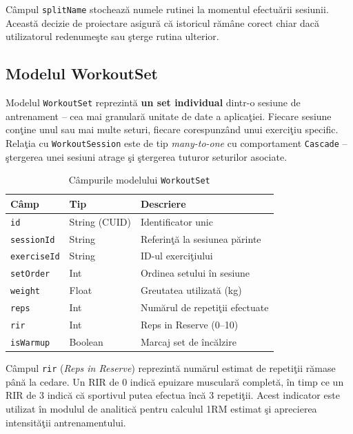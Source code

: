 C\^ ampul \texttt{splitName} stocheaz\u a numele rutinei la momentul
efectu\u arii sesiunii. Aceast\u a decizie de proiectare asigur\u a
c\u a istoricul r\u am\^ ane corect chiar dac\u a utilizatorul
redenume\c ste sau \c sterge rutina ulterior.

\subsection{Modelul WorkoutSet}

Modelul \texttt{WorkoutSet} reprezint\u a \textbf{un set individual}
dintr-o sesiune de antrenament -- cea mai granular\u a unitate de
date a aplica\c tiei. Fiecare sesiune con\c tine unul sau mai multe
seturi, fiecare corespunz\^ and unui exerci\c tiu specific. Rela\c tia
cu \texttt{WorkoutSession} este de tip \textit{many-to-one} cu
comportament \texttt{Cascade} -- \c stergerea unei sesiuni
atrage \c si \c stergerea tuturor seturilor asociate.

\begin{table}[htbp]
\centering
\caption{C\^ ampurile modelului \texttt{WorkoutSet}}
\label{tab:set}
\begin{tabular}{|l|l|l|}
\hline
\textbf{C\^ amp} & \textbf{Tip} & \textbf{Descriere} \\
\hline
\texttt{id}         & String (CUID) & Identificator unic \\
\texttt{sessionId}  & String        & Referin\c t\u a la sesiunea p\u arinte \\
\texttt{exerciseId} & String        & ID-ul exerci\c tiului \\
\texttt{setOrder}   & Int           & Ordinea setului \^ in sesiune \\
\texttt{weight}     & Float         & Greutatea utilizat\u a (kg) \\
\texttt{reps}       & Int           & Num\u arul de repeti\c tii efectuate \\
\texttt{rir}        & Int           & Reps in Reserve (0--10) \\
\texttt{isWarmup}   & Boolean       & Marcaj set de \^ inc\u alzire \\
\hline
\end{tabular}
\end{table}

C\^ ampul \texttt{rir} (\textit{Reps in Reserve}) reprezint\u a
num\u arul estimat de repeti\c tii r\u amase p\^ an\u a la cedare.
Un RIR de 0 indic\u a epuizare muscular\u a complet\u a, \^ in timp
ce un RIR de 3 indic\u a c\u a sportivul putea efectua \^ inc\u a
3 repeti\c tii. Acest indicator este utilizat \^ in modulul de
analitic\u a pentru calculul 1RM estimat \c si aprecierea
intensit\u a\c tii antrenamentului.

